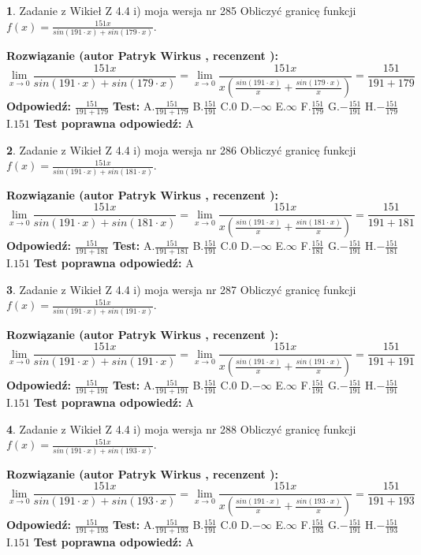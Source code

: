 \documentclass[12pt, a4paper]{article}
\theoremstyle{definition} %
\newtheorem{zad}{}
\newcommand{\zadStart}[1]{\begin{zad}#1\newline}
\newcommand{\zadStop}{\end{zad}}
\newcommand{\rozwStart}[2]{\noindent \textbf{Rozwiązanie (autor #1 , recenzent #2): }\newline}
\newcommand{\rozwStop}{\newline}
\newcommand{\odpStart}{\noindent \textbf{Odpowiedź:}\newline}
\newcommand{\odpStop}{\newline}
\newcommand{\testStart}{\noindent \textbf{Test:}\newline}
\newcommand{\testStop}{\newline}
\newcommand{\kluczStart}{\noindent \textbf{Test poprawna odpowiedź:}\newline}
\newcommand{\kluczStop}{\newline}
\begin{document}
\zadStart{Zadanie z Wikieł Z 4.4 i) moja wersja nr 285}
Obliczyć granicę funkcji $f(x)=\frac{151x}{sin(191\cdot x) +sin(179\cdot x)}$.
\zadStop
\rozwStart{Patryk Wirkus}{}
$$\lim\limits_{x\to 0}\frac{151x}{sin(191\cdot x) +sin(179\cdot x)}=\lim\limits_{x\to 0}\frac{151x}{x(\frac{sin(191\cdot x)}{x}+\frac{sin(179\cdot x)}{x})}=\frac{151}{191+179}$$
\rozwStop
\odpStart
$\frac{151}{191+179}$
\odpStop
\testStart
A.$\frac{151}{191+179}$
B.$\frac{151}{191}$
C.$0$
D.$-\infty$
E.$\infty$
F.$\frac{151}{179}$
G.$-\frac{151}{191}$
H.$-\frac{151}{179}$
I.$151$
\testStop
\kluczStart
A
\kluczStop



\zadStart{Zadanie z Wikieł Z 4.4 i) moja wersja nr 286}
Obliczyć granicę funkcji $f(x)=\frac{151x}{sin(191\cdot x) +sin(181\cdot x)}$.
\zadStop
\rozwStart{Patryk Wirkus}{}
$$\lim\limits_{x\to 0}\frac{151x}{sin(191\cdot x) +sin(181\cdot x)}=\lim\limits_{x\to 0}\frac{151x}{x(\frac{sin(191\cdot x)}{x}+\frac{sin(181\cdot x)}{x})}=\frac{151}{191+181}$$
\rozwStop
\odpStart
$\frac{151}{191+181}$
\odpStop
\testStart
A.$\frac{151}{191+181}$
B.$\frac{151}{191}$
C.$0$
D.$-\infty$
E.$\infty$
F.$\frac{151}{181}$
G.$-\frac{151}{191}$
H.$-\frac{151}{181}$
I.$151$
\testStop
\kluczStart
A
\kluczStop



\zadStart{Zadanie z Wikieł Z 4.4 i) moja wersja nr 287}
Obliczyć granicę funkcji $f(x)=\frac{151x}{sin(191\cdot x) +sin(191\cdot x)}$.
\zadStop
\rozwStart{Patryk Wirkus}{}
$$\lim\limits_{x\to 0}\frac{151x}{sin(191\cdot x) +sin(191\cdot x)}=\lim\limits_{x\to 0}\frac{151x}{x(\frac{sin(191\cdot x)}{x}+\frac{sin(191\cdot x)}{x})}=\frac{151}{191+191}$$
\rozwStop
\odpStart
$\frac{151}{191+191}$
\odpStop
\testStart
A.$\frac{151}{191+191}$
B.$\frac{151}{191}$
C.$0$
D.$-\infty$
E.$\infty$
F.$\frac{151}{191}$
G.$-\frac{151}{191}$
H.$-\frac{151}{191}$
I.$151$
\testStop
\kluczStart
A
\kluczStop



\zadStart{Zadanie z Wikieł Z 4.4 i) moja wersja nr 288}
Obliczyć granicę funkcji $f(x)=\frac{151x}{sin(191\cdot x) +sin(193\cdot x)}$.
\zadStop
\rozwStart{Patryk Wirkus}{}
$$\lim\limits_{x\to 0}\frac{151x}{sin(191\cdot x) +sin(193\cdot x)}=\lim\limits_{x\to 0}\frac{151x}{x(\frac{sin(191\cdot x)}{x}+\frac{sin(193\cdot x)}{x})}=\frac{151}{191+193}$$
\rozwStop
\odpStart
$\frac{151}{191+193}$
\odpStop
\testStart
A.$\frac{151}{191+193}$
B.$\frac{151}{191}$
C.$0$
D.$-\infty$
E.$\infty$
F.$\frac{151}{193}$
G.$-\frac{151}{191}$
H.$-\frac{151}{193}$
I.$151$
\testStop
\kluczStart
A
\kluczStop
\end{document}
